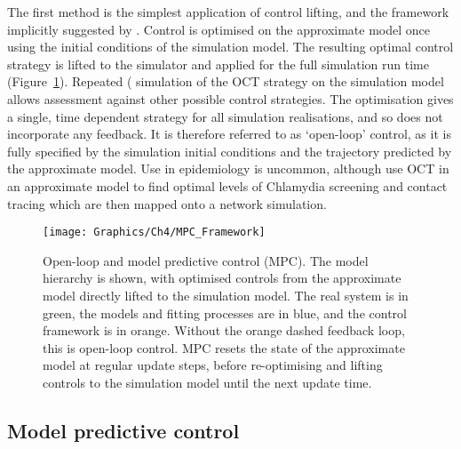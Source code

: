 The first method is the simplest application of control lifting, and the framework implicitly suggested by \citet{an_optimization_2017}. Control is optimised on the approximate model once using the initial conditions of the simulation model. The resulting optimal control strategy is lifted to the simulator and applied for the full simulation run time (Figure~\ref{fig:ch4:mpc_framework}). Repeated ( simulation of the OCT strategy on the simulation model allows assessment against other possible control strategies. The optimisation gives a single, time dependent strategy for all simulation realisations, and so does not incorporate any feedback. It is therefore referred to as `open-loop' control, as it is fully specified by the simulation initial conditions and the trajectory predicted by the approximate model. Use in epidemiology is uncommon, although \citet{clarke_approximating_2013} use OCT in an approximate model to find optimal levels of Chlamydia screening and contact tracing which are then mapped onto a network simulation.

\begin{figure}[htb]
    \begin{center}
        \texttt{[image: Graphics/Ch4/MPC\_Framework]}
        \caption{Open-loop and model predictive control (MPC). The model hierarchy is shown, with optimised controls from the approximate model directly lifted to the simulation model. The real system is in green, the models and fitting processes are in blue, and the control framework is in orange. Without the orange dashed feedback loop, this is open-loop control. MPC resets the state of the approximate model at regular update steps, before re-optimising and lifting controls to the simulation model until the next update time. }
        \label{fig:ch4:mpc_framework}
    \end{center}
\end{figure}

\subsection*{Model predictive control}

